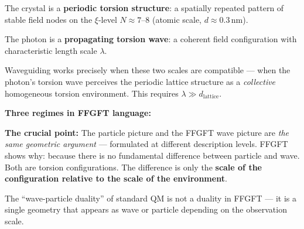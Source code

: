 \begin{foundation}

The crystal is a \textbf{periodic torsion structure}:
a spatially repeated pattern of stable field nodes
on the $\xi$-level $N \approx 7$--8 (atomic scale, $d \approx 0.3$\,nm).

The photon is a \textbf{propagating torsion wave}:
a coherent field configuration with characteristic
length scale $\lambda$.

Waveguiding works precisely when these
two scales are compatible --- when the photon's
torsion wave perceives the periodic lattice structure
as a \emph{collective} homogeneous torsion environment.
This requires $\lambda \gg d_\text{lattice}$.

\medskip
\textbf{Three regimes in FFGFT language:}

\begin{center}
\end{center}

\medskip
\textbf{The crucial point:}
The particle picture and the FFGFT wave picture are
\emph{the same geometric argument} ---
formulated at different description levels.
FFGFT shows why: because there is no fundamental
difference between particle and wave.
Both are torsion configurations.
The difference is only the \textbf{scale of the configuration
relative to the scale of the environment}.

The ``wave-particle duality'' of standard QM
is not a duality in FFGFT --- it is a single
geometry that appears as wave or particle depending
on the observation scale.
\end{foundation}

